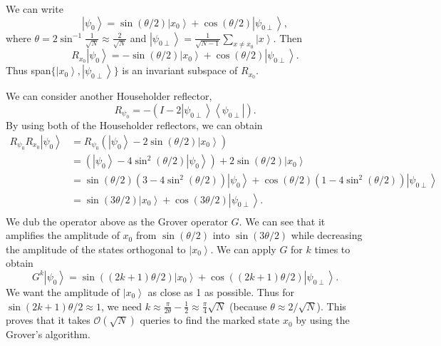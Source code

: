 \documentclass[11pt]{article}
\newcommand{\bra}[1]{\left\langle #1\right|}
\newcommand{\ket}[1]{\left|#1\right\rangle}
\begin{document}
We can write 
\begin{equation}
    \ket{\psi_0} = \sin(\theta/2)\ket{x_0} + \cos(\theta/2)\ket{\psi_{0\perp}},
\end{equation}
where $\theta = 2\sin^{-1}\frac{1}{\sqrt{N}} \approx \frac{2}{\sqrt{N}}$ and $\ket{\psi_{0\perp}} = \frac{1}{\sqrt{N-1}}\sum_{x\neq x_0}\ket{x}$. Then 
\begin{equation}
    R_{x_0}\ket{\psi_0} = -\sin(\theta/2)\ket{x_0} + \cos(\theta/2)\ket{\psi_{0\perp}}.
\end{equation}
Thus span$\{\ket{x_0},\ket{\psi_{0\perp}}\}$ is an invariant subspace of $R_{x_0}$. 

We can consider another Householder reflector, 
\begin{equation}
    R_{\psi_{0}} = -(I - 2\ket{\psi_{0\perp}}\bra{\psi_{0\perp}}).
\end{equation}
By using both of the Householder reflectors, we can obtain 
\begin{align}
    R_{\psi_{0}}R_{x_0}\ket{\psi_0} &= R_{\psi_0}(\ket{\psi_0} - 2\sin(\theta/2)\ket{x_0}) \nonumber \\
    &= (\ket{\psi_0} - 4\sin^2(\theta/2)\ket{\psi_0}) + 2\sin(\theta/2)\ket{x_0} \nonumber \\ 
    &= \sin(\theta/2)(3 - 4\sin^2(\theta/2))\ket{\psi_0} + \cos(\theta/2)(1 - 4\sin^2(\theta/2))\ket{\psi_{0\perp}}\nonumber \\ 
    &= \sin(3\theta/2)\ket{x_0} + \cos(3\theta/2)\ket{\psi_{0\perp}}.\nonumber \\ 
\end{align}
We dub the operator above as the Grover operator $G$. We can see that it amplifies the amplitude of $x_0$ from $\sin(\theta/2)$ into $\sin(3\theta/2)$ while decreasing the amplitude of the states orthogonal to $\ket{x_0}$. We can apply $G$ for $k$ times to obtain 
\begin{equation}
    G^k\ket{\psi_0} = \sin((2k+1)\theta/2)\ket{x_0} + \cos((2k+1)\theta/2)\ket{\psi_{0\perp}}.
\end{equation}
We want the amplitude of $\ket{x_0}$ as close as 1 as possible. Thus for $\sin(2k+1)\theta/2 \approx 1$, we need $k \approx \frac{\pi}{2\theta} - \frac{1}{2}\approx \frac{\pi}{4}\sqrt{N}$ (because $\theta \approx 2/\sqrt{N}$). This proves that it takes $\mathcal{O}(\sqrt{N})$ queries to find the marked state $x_0$ by using the Grover's algorithm.
\end{document}
